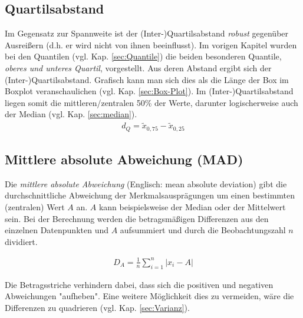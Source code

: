 \documentclass[a4paper]{article}
\begin{document}
\noindent {}

\subsection{Quartilsabstand}
Im Gegensatz zur Spannweite ist der (Inter-)Quartilsabstand \textit{robust} gegenüber Ausreißern (d.h. er wird nicht von ihnen beeinflusst). Im vorigen Kapitel wurden bei den Quantilen (vgl. Kap. \ref{sec:Quantile}) die beiden besonderen Quantile, \textit{oberes und unteres Quartil}, vorgestellt. Aus deren Abstand ergibt sich der (Inter-)Quartilsabstand. Grafisch kann man sich dies als die Länge der Box im Boxplot veranschaulichen (vgl. Kap. \ref{sec:Box-Plot}).
Im (Inter-)Quartilsabstand liegen somit die mittleren/zentralen 50\% der Werte, darunter logischerweise auch der Median (vgl. Kap. \ref{sec:median}).
\begin{align*}
    d_Q = \tilde{x}_{0,75}-\tilde{x}_{0,25}
\end{align*}

\noindent {}

\subsection{Mittlere absolute Abweichung (MAD)}
Die \textit{mittlere absolute Abweichung} (Englisch: mean absolute deviation) gibt die durchschnittliche Abweichung der Merkmalsausprägungen um einen bestimmten (zentralen) Wert $A$ an. $A$ kann beispielsweise der Median oder der Mittelwert sein. Bei der Berechnung werden die betragsmäßigen Differenzen aus den einzelnen Datenpunkten und $A$ aufsummiert und durch die Beobachtungszahl $n$ dividiert.

\begin{align*}
    D_A = \frac{1}{n} \sum_{i=1}^n |x_i-A| 
\end{align*}

\noindent Die Betragsstriche verhindern dabei, dass sich die positiven und negativen Abweichungen "aufheben". Eine weitere Möglichkeit dies zu vermeiden, wäre die Differenzen zu quadrieren (vgl. Kap. \ref{sec:Varianz}).\\
\end{document}
